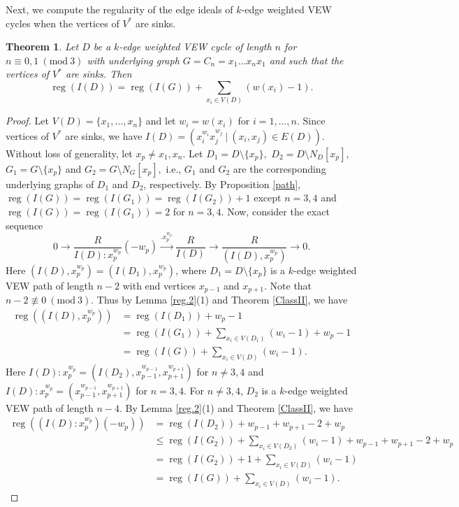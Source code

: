 \documentclass[11pt,reqno]{amsart}
\newcommand{\reg}{\operatorname{reg}}
\newtheorem{theorem}{Theorem}[section]
\theoremstyle{definition}
\begin{document}
Next, we compute the regularity of the edge ideals of $k$-edge weighted VEW cycles when the vertices of $V^*$ are sinks.


\begin{theorem} \label{cycle1}
	Let $ D $ be a  $k$-edge weighted VEW cycle of length $ n $ for $ n\equiv 0,1~(\mbox{mod}~3)$  with  underlying graph  $ G= C_n=x_1\ldots x_nx_1$ and such that the vertices of $ V^* $ are sinks. Then $$\reg(I(D)) = \reg(I(G)) + \displaystyle{ \sum_{x_i \in V(D)}}(w(x_i) - 1).$$   
\end{theorem}

\begin{proof}
Let $ V(D)=\{x_1,\ldots,x_n\} $ and let $ w_i=w(x_i)  $ for $i=1, \ldots, n.$ Since vertices of $ V^* $ are sinks, we have $I(D) = (x_i^{w_i}   x_j^{w_j}  ~|~  (x_i,x_j) \in E(D))$. Without loss of generality, let  $ x_p  \neq x_1,x_n$.  
	Let $ D_1 = D \setminus \{x_p\} ,$ $ D_2 = D \setminus N_D[x_p] ,$ $ G_1=G \setminus \{x_p\} $ and  $ G_2 = G \setminus N_G[x_p] ,$ i.e., $ G_1 $ and $ G_2 $ are the corresponding underlying graphs of $D_1 $ and  $ D_2 $, respectively.  
	By Proposition \ref{path}, $\reg(I(G))   =  \reg(I(G_1))=\reg(I(G_2)) + 1    $ except $n=3,4$ 
	and $\reg(I(G))   =  \reg(I(G_1))=2$ for $n=3,4$. Now, consider the exact sequence
	\begin{equation}\label{2}
		0 \longrightarrow {\frac{R}{I(D):x_p^{w_p} }}(-w_p) \xrightarrow{.x_p^{w_p}} {\frac{R}{I(D) }} \longrightarrow {\frac{R}{(I(D),x_p^{w_p} )}} \longrightarrow 0.
	\end{equation}		
	Here $(I(D),x_p^{w_p})= (I(D_1),x_p^{w_p})$, where $ D_1 = D \setminus \{x_p\} $ is a $k$-edge weighted VEW path of length $ n-2 $ with end vertices $x_{p-1}$ and $x_{p+1}$. Note that $ n-2\nequiv 0~(\mbox{mod}~3)$.  Thus by Lemma \ref{reg.2}(1) and Theorem \ref{ClassII}, we have
	\begin{align*}
		\reg((I(D),x_p^{w_p}))&=\reg(I(D_1))+ {w_p} - 1\\
		&=\reg(I(G_1)) +   \displaystyle{ \sum_{x_i \in V(D_1) }}(w_i - 1)+ {w_p} - 1\\
        &= \reg(I(G)) +   \displaystyle{ \sum_{x_i \in V(D)}}(w_i - 1).
	\end{align*}
	Here $I(D):x_p^{w_p}=(I(D_2),x_{p-1}^{w_{p-1}},x_{p+1}^{w_{p+1}})$ for $n \neq 3,4$ and $I(D):x_p^{w_p}=
	(x_{p-1}^{w_{p-1}},x_{p+1}^{w_{p+1}})$ for $n=3,4.$ For $n  \neq 3, 4$, $ D_2  $ is a $k$-edge weighted VEW path of length $ n-4 $. By Lemma \ref{reg.2}(1) and Theorem    \ref{ClassII}, we have
	\begin{align*}
		\reg((I(D):x_p^{w_p})(-{w_p}))&=\reg(I(D_2)) +  w_{p-1} + w_{p+1} - 2 +  {w_p}\\
		&\leq \reg(I(G_2)) +   \displaystyle{ \sum_{x_i \in V(D_2) }}(w_i - 1)+  w_{p-1} + w_{p+1} - 2 +  {w_p}\\
		&=\reg(I(G_2)) + 1 +   \displaystyle{ \sum_{x_i \in V(D)}}(w_i - 1)\\
		&=\reg(I(G)) +   \displaystyle{ \sum_{x_i \in V(D)}}(w_i - 1).
	\end{align*}
	

\end{proof}
\end{document}
